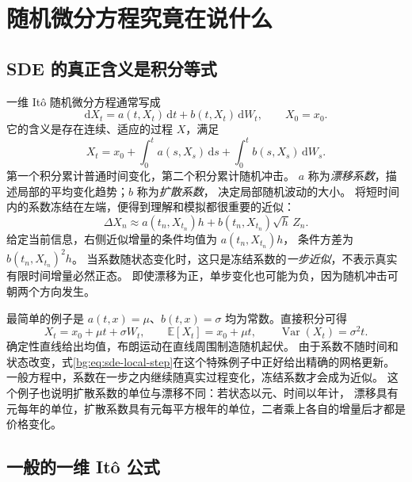 \documentclass[11pt,a4paper,fontset=none]{ctexart}
\numberwithin{equation}{section}
\newcommand{\E}{\mathbb E}
\DeclareMathOperator{\Var}{Var}
\begin{document}
\section{随机微分方程究竟在说什么}
\label{bg:sec:sde}

\subsection{SDE 的真正含义是积分等式}
\label{bg:sub:sde-meaning}

一维 It\^o 随机微分方程通常写成
\begin{equation}
  \mathrm dX_t=a(t,X_t)\,\mathrm dt+b(t,X_t)\,\mathrm dW_t,
  \qquad X_0=x_0.
  \label{bg:eq:sde-differential}
\end{equation}
它的含义是存在连续、适应的过程 $X$，满足
\begin{equation}
  X_t=x_0+\int_0^t a(s,X_s)\,\mathrm ds
             +\int_0^t b(s,X_s)\,\mathrm dW_s.
  \label{bg:eq:sde-integral}
\end{equation}
第一个积分累计普通时间变化，第二个积分累计随机冲击。
$a$ 称为\emph{漂移系数}，描述局部的平均变化趋势；$b$ 称为\emph{扩散系数}，
决定局部随机波动的大小。
将短时间内的系数冻结在左端，便得到理解和模拟都很重要的近似：
\begin{equation}
  \Delta X_n\approx a(t_n,X_{t_n})h+b(t_n,X_{t_n})\sqrt h\,Z_n.
  \label{bg:eq:sde-local-step}
\end{equation}
给定当前信息，右侧近似增量的条件均值为 $a(t_n,X_{t_n})h$，
条件方差为 $b(t_n,X_{t_n})^2h$。
当系数随状态变化时，这只是冻结系数的\emph{一步近似}，不表示真实有限时间增量必然正态。
即使漂移为正，单步变化也可能为负，因为随机冲击可朝两个方向发生。

最简单的例子是 $a(t,x)=\mu$、$b(t,x)=\sigma$ 均为常数。直接积分可得
\begin{equation}
 X_t=x_0+\mu t+\sigma W_t,\qquad
 \E[X_t]=x_0+\mu t,\qquad \Var(X_t)=\sigma^2t.
 \label{bg:eq:additive-sde}
\end{equation}
确定性直线给出均值，布朗运动在直线周围制造随机起伏。
由于系数不随时间和状态改变，式\eqref{bg:eq:sde-local-step}在这个特殊例子中正好给出精确的网格更新。
一般方程中，系数在一步之内继续随真实过程变化，冻结系数才会成为近似。
这个例子也说明扩散系数的单位与漂移不同：若状态以元、时间以年计，
漂移具有元每年的单位，扩散系数具有元每平方根年的单位，二者乘上各自的增量后才都是价格变化。

\subsection{一般的一维 It\^o 公式}
\label{bg:sub:general-ito}
\end{document}
